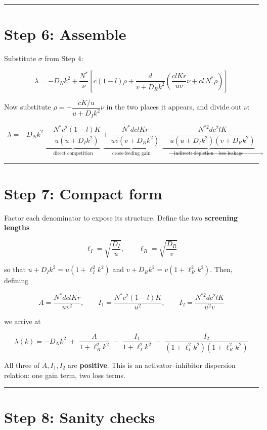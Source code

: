 \documentclass[11pt]{article}
\begin{document}
\bigskip\hrule\bigskip

\section*{Step 6: Assemble}

Substitute $\sigma$ from Step 4:

\[
\lambda = -D_Nk^2 + \frac{N^*}{\nu}\left[c(1-l)\rho + \frac{d}{v+D_R k^2}\left(\frac{clKr}{uv}\nu + cl\,N^*\rho\right)\right]
\]

Now substitute $\rho = -\dfrac{cK/u}{u+D_Ik^2}\nu$ in the two places it appears, and divide out $\nu$:

\[
\lambda = -D_Nk^2 \;\underbrace{-\; \frac{N^*c^2(1-l)K}{u\left(u+D_Ik^2\right)}}_{\text{direct competition}} \;\underbrace{+\; \frac{N^*d clKr}{uv\left(v+D_R k^2\right)}}_{\text{cross-feeding gain}} \;\underbrace{-\; \frac{N^{*2}d c^2 lK}{u\left(u+D_Ik^2\right)\left(v+D_R k^2\right)}}_{\text{indirect: depletion} \to \text{less leakage}}
\]

\bigskip\hrule\bigskip

\section*{Step 7: Compact form}

Factor each denominator to expose its structure. Define the two \textbf{screening lengths}

\[
\ell_I = \sqrt{\frac{D_I}{u}}, \qquad \ell_R = \sqrt{\frac{D_R}{v}}
\]

so that $u + D_Ik^2 = u\left(1+\ell_I^2k^2\right)$ and $v+D_R k^2 = v\left(1+\ell_R^2k^2\right)$. Then, defining

\[
A = \frac{N^*d clKr}{uv^2}, \qquad I_1 = \frac{N^*c^2(1-l)K}{u^2}, \qquad I_2 = \frac{N^{*2}d c^2lK}{u^2v}
\]

we arrive at

\[
\boxed{\;\lambda(k) = -D_Nk^2 \;+\; \frac{A}{1+\ell_R^2k^2} \;-\; \frac{I_1}{1+\ell_I^2k^2} \;-\; \frac{I_2}{\left(1+\ell_I^2k^2\right)\left(1+\ell_R^2k^2\right)}\;}
\]

All three of $A, I_1, I_2$ are \textbf{positive}. This is an activator--inhibitor dispersion relation: one gain term, two loss terms.

\bigskip\hrule\bigskip

\section*{Step 8: Sanity checks}
\end{document}
